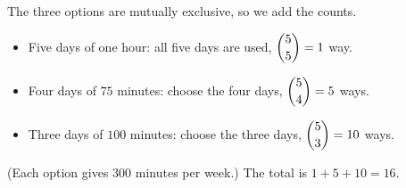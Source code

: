The three options are mutually exclusive, so we add the counts.
\begin{itemize}
\item Five days of one hour: all five days are used, $\dbinom55=1$ way.
\item Four days of $75$ minutes: choose the four days, $\dbinom54=5$ ways.
\item Three days of $100$ minutes: choose the three days, $\dbinom53=10$ ways.
\end{itemize}
(Each option gives $300$ minutes per week.) The total is $1+5+10=\boxed{16}$.
